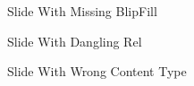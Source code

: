 \documentclass[11pt,a4paper]{article}
\begin{document}
Slide With Missing BlipFill

Slide With Dangling Rel

Slide With Wrong Content Type
\end{document}
